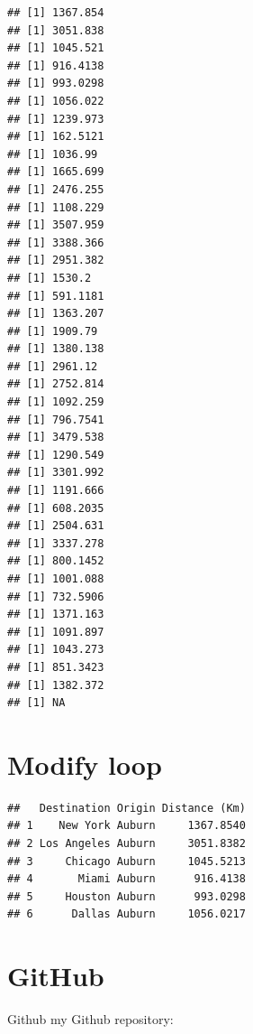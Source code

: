 \documentclass[
]{article}
\newenvironment{Shaded}{\begin{snugshade}}{\end{snugshade}}
\newcommand{\ConstantTok}[1]{\textcolor[rgb]{0.56,0.35,0.01}{#1}}
\newcommand{\ControlFlowTok}[1]{\textcolor[rgb]{0.13,0.29,0.53}{\textbf{#1}}}
\newcommand{\FunctionTok}[1]{\textcolor[rgb]{0.13,0.29,0.53}{\textbf{#1}}}
\newcommand{\NormalTok}[1]{#1}
\newcommand{\OtherTok}[1]{\textcolor[rgb]{0.56,0.35,0.01}{#1}}
\newcommand{\SpecialCharTok}[1]{\textcolor[rgb]{0.81,0.36,0.00}{\textbf{#1}}}
\newcommand{\StringTok}[1]{\textcolor[rgb]{0.31,0.60,0.02}{#1}}
\begin{document}
\begin{verbatim}
## [1] 1367.854
## [1] 3051.838
## [1] 1045.521
## [1] 916.4138
## [1] 993.0298
## [1] 1056.022
## [1] 1239.973
## [1] 162.5121
## [1] 1036.99
## [1] 1665.699
## [1] 2476.255
## [1] 1108.229
## [1] 3507.959
## [1] 3388.366
## [1] 2951.382
## [1] 1530.2
## [1] 591.1181
## [1] 1363.207
## [1] 1909.79
## [1] 1380.138
## [1] 2961.12
## [1] 2752.814
## [1] 1092.259
## [1] 796.7541
## [1] 3479.538
## [1] 1290.549
## [1] 3301.992
## [1] 1191.666
## [1] 608.2035
## [1] 2504.631
## [1] 3337.278
## [1] 800.1452
## [1] 1001.088
## [1] 732.5906
## [1] 1371.163
## [1] 1091.897
## [1] 1043.273
## [1] 851.3423
## [1] 1382.372
## [1] NA
\end{verbatim}

\section{Modify loop}\label{modify-loop}

\begin{Shaded}
\end{Shaded}

\begin{verbatim}
##   Destination Origin Distance (Km)
## 1    New York Auburn     1367.8540
## 2 Los Angeles Auburn     3051.8382
## 3     Chicago Auburn     1045.5213
## 4       Miami Auburn      916.4138
## 5     Houston Auburn      993.0298
## 6      Dallas Auburn     1056.0217
\end{verbatim}

\section{GitHub}\label{github}

Github my Github repository:
\end{document}
